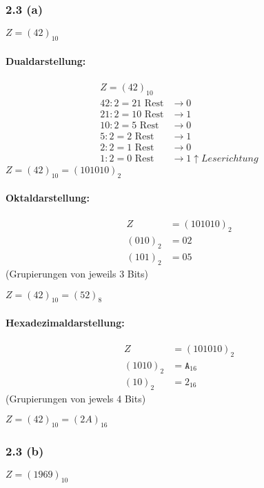 \documentclass[11pt,a4paper]{article}
\begin{document}
\subsubsection{2.3 (a)}
$Z = (42)_{10}$

\paragraph{Dualdarstellung:}
\begin{align*}
Z = (42)_{10}\\
42: 2 = 21 \mbox{ Rest} &\rightarrow 0\\
21: 2 = 10 \mbox{ Rest} &\rightarrow 1\\
10:2 = 5 \mbox{ Rest} &\rightarrow 0\\
5 : 2 = 2 \mbox{ Rest} &\rightarrow 1\\
2 : 2 = 1 \mbox{ Rest} &\rightarrow 0\\
1 : 2 = 0 \mbox{ Rest} &\rightarrow 1 \uparrow Leserichtung
\end{align*}
$Z = (42)_{10} = (101010)_2$

\paragraph{Oktaldarstellung:}
\begin{align*}
Z &= (101010)_2\\
(010)_2 &= 02\\
(101)_2 &= 05
\end{align*}
(Grupierungen von jeweils 3 Bits)

$Z = (42)_{10} = (52)_8$

\paragraph{Hexadezimaldarstellung:}
\begin{align*}
Z &= (101010)_2\\
(1010)_2 &= \mathtt{A}_{16}\\
(10)_2 &= 2_{16}
\end{align*}
(Grupierungen von jewels 4 Bits)

$Z = (42)_{10} = (2A)_{16}$

\newpage
\subsubsection{2.3 (b)}

$Z = (1969)_{10}$
\end{document}
